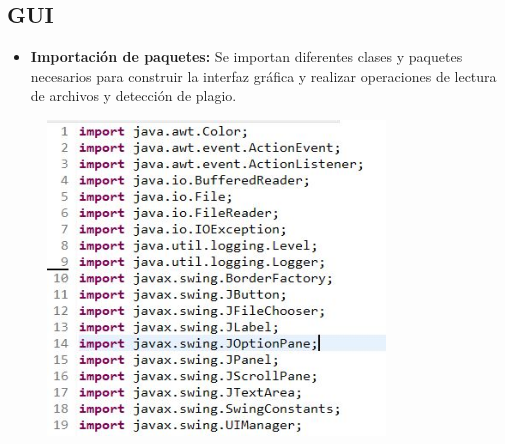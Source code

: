 \documentclass{article}
\begin{document}
	 \subsection{GUI}
	 \begin{itemize}
	 \item \textbf{Importación de paquetes:} Se importan diferentes clases y paquetes necesarios para construir la interfaz gráfica y realizar operaciones de lectura de archivos y detección de plagio.
	 \end{itemize}
	 \begin{figure}[H]
		\centering
		\includegraphics[width=0.8\textwidth,keepaspectratio]{img/GUI1.jpg}
	\end{figure}
	
\end{document}
